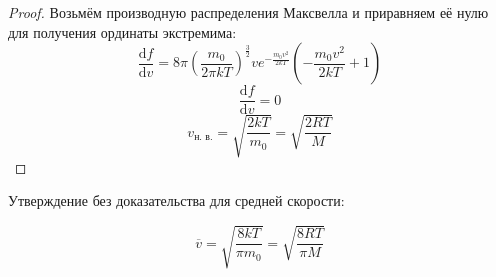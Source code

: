 \begin{proof}
	Возьмём производную распределения Максвелла и приравняем её нулю для получения ординаты экстремима:
	\[\frac{\text{d}f}{\text{d}v}=8\pi(\frac{m_0}{2\pi k T})^{\frac{3}{2}}ve^{-\frac{m_0v^2}{2 k T}}(-\frac{m_0 v^2}{2kT}+1)\]
	\[\frac{\text{d}f}{\text{d}v}=0\]
	\[v_{\text{н. в.}}=\sqrt{\frac{2kT}{m_0}}=\sqrt{\frac{2RT}{M}}\]
\end{proof}

Утверждение без доказательства для средней скорости:\par
\[\overline{v}=\sqrt{\frac{8kT}{\pi m_0}}=\sqrt{\frac{8RT}{\pi M}}\]